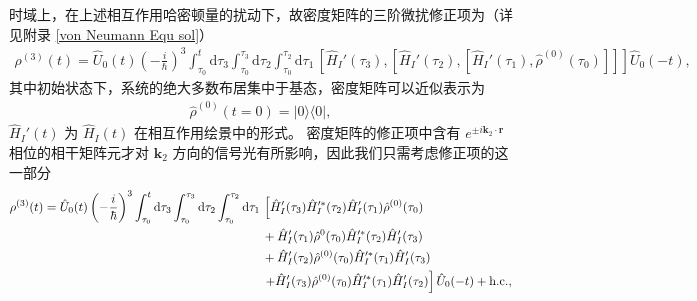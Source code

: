 \documentclass{thesis}
\begin{document}
时域上，在上述相互作用哈密顿量的扰动下，故密度矩阵的三阶微扰修正项为（详见附录 \ref{von Neumann Equ sol}）
\begin{align}
    \rho^{(3)}(t)=\hat{U}_0(t)\left(-\frac{i}{\hbar}\right)^3\int_{\tau_0}^t\mathrm{d}\tau_3\int_{\tau_0}^{\tau_3}\mathrm{d}\tau_2\int_{\tau_0}^{\tau_2}\mathrm{d}\tau_1\,\left[\hat{H}_I'(\tau_3),\left[\hat{H}_I'(\tau_2),\left[\hat{H}_I'(\tau_1),\hat{\rho}^{(0)}(\tau_0)\right]\right]\right]\hat{U}_0(-t),
\end{align}
其中初始状态下，系统的绝大多数布居集中于基态，密度矩阵可以近似表示为
\begin{align}
    \hat{\rho}^{(0)}(t=0)=\lvert 0\rangle\langle 0\rvert,
\end{align}
$\hat{H}_I'(t)$ 为 $\hat{H}_I(t)$ 在相互作用绘景中的形式。
密度矩阵的修正项中含有 $e^{\pm i\bm{k}_2\cdot\bm{r}}$ 相位的相干矩阵元才对 $\bm{k}_2$ 方向的信号光有所影响，因此我们只需考虑修正项的这一部分
\begin{align}
    \notag\rho^{(3)}(t)=\hat{U}_0(t)\left(-\frac{i}{\hbar}\right)^3\int_{\tau_0}^t\mathrm{d}\tau_3\int_{\tau_0}^{\tau_3}\mathrm{d}\tau_2\int_{\tau_0}^{\tau_2}\mathrm{d}\tau_1\,&\left[\hat{H}_I'(\tau_3)\hat{H}_I'^*(\tau_2)\hat{H}_I'(\tau_1)\hat{\rho}^{(0)}(\tau_0)\right.\\
    \notag&+\hat{H}_I'(\tau_1)\hat{\rho}^{0}(\tau_0)\hat{H}_I'^*(\tau_2)\hat{H}_I'(\tau_3)\\
    \notag&+\hat{H}_I'(\tau_2)\hat{\rho}^{(0)}(\tau_0)\hat{H}_I'^*(\tau_1)\hat{H}_I'(\tau_3)\\
    &\left.+\hat{H}_I'(\tau_3)\hat{\rho}^{(0)}(\tau_0)\hat{H}_I'^*(\tau_1)\hat{H}_I'(\tau_2)\right]\hat{U}_0(-t)+\text{h.c.},
\end{align}
\end{document}
